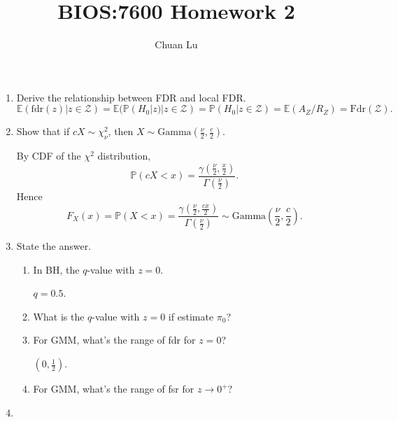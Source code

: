 \documentclass{article}
\begin{document}
\author{Chuan Lu}
\title{BIOS:7600 Homework 2}
\maketitle

\medskip

\begin{enumerate}

\item Derive the relationship between FDR and local FDR.
$$
\mathbb{E}(\text{fdr}(z)|z\in\mathcal{Z}) = \mathbb{E}(\mathbb{P}(H_0|z)|z\in\mathcal{Z}) = \mathbb{P}(H_0|z\in\mathcal{Z}) = \mathbb{E}(A_Z/R_Z) = \text{Fdr}(\mathcal{Z}).
$$

\item Show that if $cX \sim \chi_\nu^2 $, then $X \sim \text{Gamma}(\frac{\nu}{2}, \frac{c}{2})$.

By CDF of the $\chi^2 $ distribution,
$$
\mathbb{P}(cX < x) = \frac{\gamma(\frac{\nu}{2}, \frac{x}{2})}{\Gamma(\frac{\nu}{2})}.
$$
Hence
$$
F_X(x) = \mathbb{P}(X < x) = \frac{\gamma(\frac{\nu}{2}, \frac{cx}{2})}{\Gamma(\frac{\nu}{2})} \sim \text{Gamma}(\frac{\nu}{2}, \frac{c}{2}).
$$

\item State the answer.
\begin{enumerate}
\item In BH, the $q$-value with $z = 0$.

$q = 0.5$.

\item What is the $q$-value with $z = 0$ if estimate $\pi_0 $?


\item For GMM, what's the range of fdr for $z = 0$?

$(0, \frac{1}{2})$.

\item For GMM, what's the range of fsr for $z\to 0^+ $?


\end{enumerate}

\item

\end{enumerate}
\end{document}
